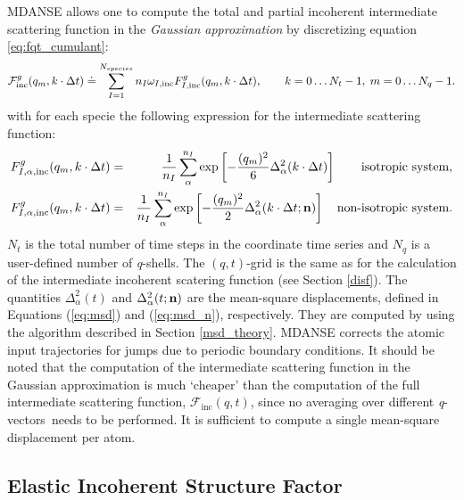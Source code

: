 \documentclass[a4paper,11pt]{article}
\newcommand{\qvects}{\textit{q}-vectors}
\newcommand{\qshells}{\textit{q}-shells}
\begin{document}
\gls{MDANSE} allows one to compute the total and partial incoherent intermediate scattering function in the
{\em Gaussian approximation} by discretizing equation \ref{eq:fqt_cumulant}:
\begin{equation}
{\cal F}^{g}_{\mathrm{inc}}(q_m,k\cdot\Delta t) \doteq \sum^{N_{species}}_{I = 1} n_I \omega_{I,\mathrm{inc}} F^{g}_{I, \mathrm{inc}}(q_m,k\cdot\Delta t),
\qquad k = 0\ldots N_t - 1,\; m = 0\ldots N_q - 1.
\end{equation}
with for each specie the following expression for the intermediate scattering function:
\begin{eqnarray}
F^{g}_{I,\alpha ,\mathrm{inc}}(q_m,k\cdot\Delta t) &=& \frac{1}{n_I}\sum^{n_I}_{\alpha} \exp\left[-\frac{(q_m)^2}{6}
  \Delta^2_\alpha(k\cdot\Delta t)\right]
\qquad\mbox{{\rm isotropic system}},\\
F^{g}_{I,\alpha ,\mathrm{inc}}(q_m,k\cdot\Delta t) &=& \frac{1}{n_I}\sum^{n_I}_{\alpha} \exp\left[-\frac{(q_m)^2}{2}
  \Delta^2_\alpha(k\cdot\Delta t;{\bf n})\right]
\quad\mbox{{\rm non-isotropic system}}.
\end{eqnarray}
$N_t$ is the total number of time steps in the coordinate time series and $N_q$ is a user-defined number of \qshells. 
The $(q,t)$-grid is the same as for the calculation of the intermediate incoherent scatering function (see Section \ref{disf}). 
The quantities $\Delta^2_\alpha(t)$ and $\Delta^2_\alpha(t;{\bf n})$ are the mean-square displacements, defined in 
Equations (\ref{eq:msd}) and (\ref{eq:msd_n}), respectively. They are computed by using the algorithm described in Section 
\ref{msd_theory}. \gls{MDANSE} corrects the atomic input trajectories for jumps due to periodic boundary conditions. It should 
be noted that the computation of the intermediate scattering function in the Gaussian approximation is much `cheaper' than 
the computation of the full intermediate scattering function, $\mathcal{F}_{\mathrm{inc}}(q,t)$, since no averaging over different 
\qvects\ needs to be performed. It is sufficient to compute a single mean-square displacement per atom.


\subsection{Elastic Incoherent Structure Factor}
\label{eisf}
\end{document}
